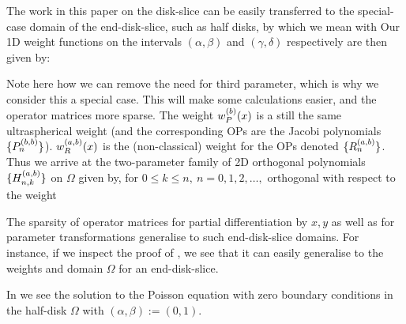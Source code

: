 The work in this paper on the disk-slice can be easily transferred to the special-case domain of the end-disk-slice, such as half disks, by which we mean
with
Our 1D weight functions on the intervals $(\alpha, \beta)$ and $(\gamma, \delta)$ respectively are then given by:

Note here how we can remove the need for third parameter, which is why we consider this a special case. This will make some calculations easier, and the operator matrices more sparse. The weight $w_P^{(b)}(x)$ is a still the same ultraspherical weight (and the corresponding OPs are the Jacobi polynomials $\{{P}_n^{(b, b)}\}$). $w_R^{(a,b)}(x)$ is the (non-classical) weight for the OPs denoted $\{R_n^{(a,b)}\}$. Thus we arrive at the two-parameter family of 2D orthogonal polynomials $\{H_{n,k}^{(a,b)}\}$ on $\Omega$ given by, for \(0 \le k \le n, \: n = 0,1,2,\dots,\)
orthogonal with respect to the weight

The sparsity of operator matrices for partial differentiation by $x, y$ as well as for parameter transformations generalise to such end-disk-slice domains. For instance, if we inspect the proof of , we see that it can easily generalise to the weights and domain $\Omega$ for an end-disk-slice.

In  we see the solution to the Poisson equation with zero boundary conditions in the half-disk $\Omega$ with $(\alpha,\beta) := (0,1)$.


